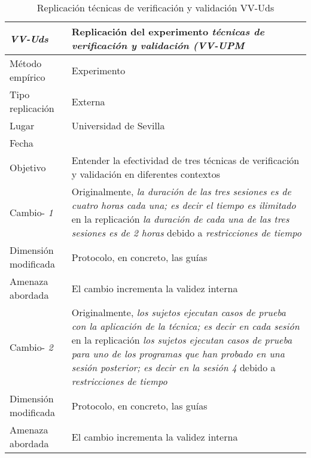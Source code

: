
\begin{table}
\caption{Replicación técnicas de verificación y validación VV-Uds}
\begin{tabular}{| p{3.3cm} | p{9cm} |}
\hline

\textbf {\textit{VV-Uds}} & Replicación del experimento \textit{técnicas de verificación y validación (VV-UPM }    \\  \hline

Método empírico &  Experimento   \\  \hline
Tipo replicación &  Externa   \\  \hline
Lugar &  Universidad de Sevilla   \\  \hline
Fecha &     \\  \hline
Objetivo  &  Entender la efectividad de tres técnicas de verificación y validación en diferentes contextos \\  \hline \hline

Cambio- \textit{1}   & \parbox[t]{9cm} {Originalmente,  \textit{ la duración de las tres sesiones es de cuatro horas cada una; es decir el tiempo es ilimitado } } \parbox[t]{9cm}{en la replicación \textit{ la duración de cada una de las tres sesiones es de 2 horas  } }  debido a  \textit{restricciones de tiempo } \\  \hline
Dimensión modificada & 
Protocolo, en concreto, las guías  \\  \hline 
Amenaza abordada  & El cambio incrementa la validez interna  \\  \hline \hline

Cambio- \textit{2}   & \parbox[t]{9cm} {Originalmente,  \textit{los sujetos ejecutan casos de prueba con la aplicación de la técnica; es decir en cada sesión} } \parbox[t]{9cm}{en la replicación \textit{los sujetos ejecutan casos de prueba para uno de los programas que han probado en una sesión posterior; es decir en la sesión 4} }  debido a  \textit{restricciones de tiempo} \\  \hline
Dimensión modificada & 
Protocolo, en concreto, las guías \\  \hline 
Amenaza abordada  & El cambio incrementa la validez interna  \\  \hline \hline


\end{tabular}
\end{table}
